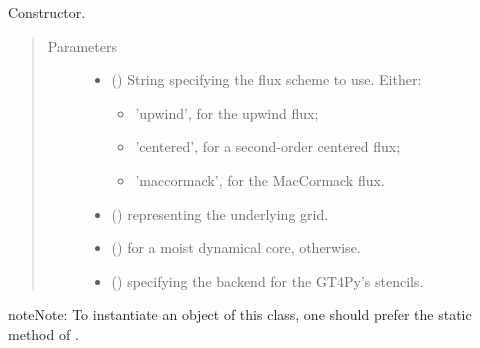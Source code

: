 \documentclass[letterpaper,10pt,english]{sphinxmanual}
\begin{document}
\begin{fulllineitems}
\begin{fulllineitems}
\label{\detokenize{api:dycore.prognostic_isentropic_centered.PrognosticIsentropicCentered.__init__}}
Constructor.
\begin{quote}\begin{description}
\item[{Parameters}] \leavevmode\begin{itemize}
\item {} 
 () \textendash{} 
String specifying the flux scheme to use. Either:
\begin{itemize}
\item {} 
’upwind’, for the upwind flux;

\item {} 
’centered’, for a second-order centered flux;

\item {} 
’maccormack’, for the MacCormack flux.

\end{itemize}


\item {} 
 () \textendash{} {\hyperref[\detokenize{api:grids.grid_xyz.GridXYZ}]{}} representing the underlying grid.

\item {} 
 () \textendash{}  for a moist dynamical core,  otherwise.

\item {} 
 () \textendash{}  specifying the backend for the GT4Py’s stencils.

\end{itemize}

\end{description}\end{quote}

\begin{sphinxadmonition}{note}{Note:}
To instantiate an object of this class, one should prefer the static method
{\hyperref[\detokenize{api:dycore.prognostic_isentropic.PrognosticIsentropic.factory}]{}} of
{\hyperref[\detokenize{api:dycore.prognostic_isentropic.PrognosticIsentropic}]{}}.
\end{sphinxadmonition}


\end{fulllineitems}
\end{fulllineitems}
\end{document}
